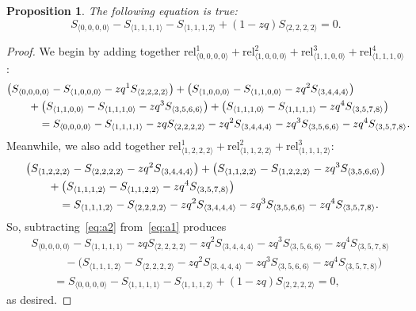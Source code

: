 \documentclass[pdftex]{sigma}
\numberwithin{equation}{section}
\newtheorem{Proposition}[Theorem]{Proposition}
\theoremstyle{definition}
\newcommand{\rel}{\text{rel}}
\begin{document}
\begin{Proposition} The following equation is true:
\begin{equation*}S_{\langle 0,0,0,0\rangle} - S_{\langle 1,1,1,1\rangle} -
S_{\langle 1,1,1,2\rangle} + (1-zq) S_{\langle 2,2,2,2\rangle}=0.
\end{equation*}
\end{Proposition}
\begin{proof}
We begin by adding together $\rel^1_{\langle 0,0,0,0\rangle}+\rel^2_{\langle 1,0,0,0\rangle}+\rel^3_{\langle 1,1,0,0\rangle}+\rel^4_{\langle 1,1,1,0\rangle}$:
\begin{align}
&\bigl(S_{\langle 0,0,0,0\rangle} - S_{\langle 1,0,0,0\rangle} - zq^{1} S_{\langle 2,2,2,2\rangle}\bigr)
 +\bigl(S_{\langle 1,0,0,0\rangle} - S_{\langle 1,1,0,0\rangle} - zq^{2} S_{\langle 3,4,4,4\rangle}\bigr) \notag\\
& \qquad {}+\bigl(S_{\langle 1,1,0,0\rangle} - S_{\langle 1,1,1,0\rangle} - zq^{3} S_{\langle 3,5,6,6\rangle}\bigr) +\bigl(S_{\langle 1,1,1,0\rangle} - S_{\langle 1,1,1,1\rangle} - zq^{4} S_{\langle 3,5,7,8\rangle} \bigr) \notag\\
& \quad\qquad {}=S_{\langle 0,0,0,0\rangle} - S_{\langle 1,1,1,1\rangle} - zq S_{\langle 2,2,2,2\rangle} - zq^{2} S_{\langle 3,4,4,4\rangle} - zq^{3} S_{\langle 3,5,6,6\rangle}
- zq^{4} S_{\langle 3,5,7,8\rangle}.\!\!\! \label{eq:a1}
\end{align}
Meanwhile, we also add together $\rel^1_{\langle 1,2,2,2\rangle}+\rel^2_{\langle 1,1,2,2\rangle}+\rel^3_{\langle 1,1,1,2\rangle}$:
\begin{align}
&\bigl(S_{\langle 1,2,2,2\rangle} - S_{\langle 2,2,2,2\rangle} - zq^{2} S_{\langle 3,4,4,4\rangle}\bigr) +\bigl(S_{\langle 1,1,2,2\rangle} - S_{\langle 1,2,2,2\rangle} - zq^{3} S_{\langle 3,5,6,6\rangle}\bigr) \notag\\
& \qquad {}+\bigl(S_{\langle 1,1,1,2\rangle} - S_{\langle 1,1,2,2\rangle} - zq^{4} S_{\langle 3,5,7,8\rangle}\bigr) \notag\\
& \qquad\quad{} = S_{\langle 1,1,1,2\rangle}- S_{\langle 2,2,2,2\rangle} - zq^{2} S_{\langle 3,4,4,4\rangle}
- zq^{3} S_{\langle 3,5,6,6\rangle} - zq^{4} S_{\langle 3,5,7,8\rangle}. \label{eq:a2}
\end{align}
So, subtracting~\eqref{eq:a2} from~\eqref{eq:a1} produces
\begin{align*}
&S_{\langle 0,0,0,0\rangle} - S_{\langle 1,1,1,1\rangle} - zq S_{\langle 2,2,2,2\rangle} - zq^{2} S_{\langle 3,4,4,4\rangle} - zq^{3} S_{\langle 3,5,6,6\rangle}
- zq^{4} S_{\langle 3,5,7,8\rangle} \\
& \qquad\quad{} -\bigl(S_{\langle 1,1,1,2\rangle}- S_{\langle 2,2,2,2\rangle} - zq^{2} S_{\langle 3,4,4,4\rangle}
- zq^{3} S_{\langle 3,5,6,6\rangle} - zq^{4} S_{\langle 3,5,7,8\rangle}\bigr) \\
& \qquad =S_{\langle 0,0,0,0\rangle} - S_{\langle 1,1,1,1\rangle} - S_{\langle 1,1,1,2\rangle}+(1-zq)S_{\langle 2,2,2,2\rangle} =0,
\end{align*}
as desired.
\end{proof}
\end{document}

